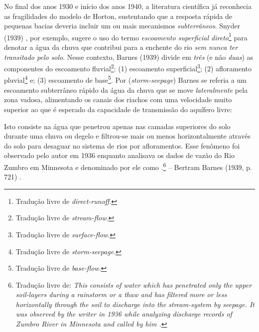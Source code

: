 \documentclass[./main.tex]{subfiles}
\begin{document}

\par No final dos anos 1930 e início dos anos 1940, a literatura científica já reconhecia as fragilidades do modelo de Horton, sustentando que a resposta rápida de pequenas bacias deveria incluir um ou mais mecanismos \textit{subterrâneos}. Snyder (1939) \cite{Snyder1939}, por exemplo, sugere o uso do termo \textit{escoamento superficial direto}\footnote{Tradução livre de \textit{direct-runoff}.} para denotar a água da chuva que contribui para a enchente do rio \textit{sem nunca ter transitado pelo solo}. Nesse contexto, Barnes (1939) \cite{Barnes1939} divide em \textit{três} (e não \textit{duas}) as componentes do escoamento fluvial\footnote{Tradução livre de \textit{stream-flow}.}: (1) escoamento superficial\footnote{Tradução livre de \textit{surface-flow}.}; (2) afloramento pluvial\footnote{Tradução livre de \textit{storm-seepage}.} e; (3) escoamento de base\footnote{Tradução livre de \textit{base-flow}.}. Por  (\textit{storm-seepage}) Barnes se referia a um escoamento subterrâneo rápido da água da chuva que se move \textit{lateralmente} pela zona vadosa, alimentando os canais dos riachos com uma velocidade muito superior ao que é esperado da capacidade de transmissão do aquífero livre:

\begin{adjustwidth}{100pt}{0pt}
\medskip
\small Isto consiste na água que penetrou apenas nas camadas superiores do solo durante uma chuva ou degelo e filtrou-se mais ou menos horizontalmente através do solo para desaguar no sistema de rios por afloramentos. Esse fenômeno foi observado pelo autor em 1936 enquanto analisava os dados de vazão do Rio Zumbro em Minnesota e denominado por ele como .\footnote{Tradução livre de: \textit{This consists of water which has penetrated only the upper soil-layers during a rainstorm or a thaw and has filtered more or less horizontally through the soil to discharge into the stream-system by seepage. It was observed by the writer in 1936 while analyzing discharge records of Zumbro River in Minnesota and called by him .}} -- Bertram Barnes (1939, p. 721) \cite{Barnes1939}.
\medskip
\end{adjustwidth}
\end{document}
